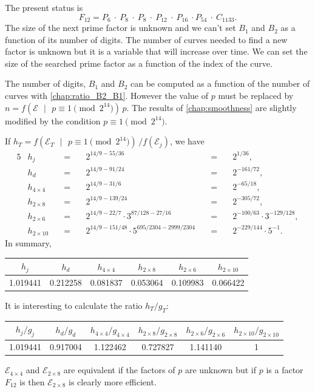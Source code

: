 \documentclass[a4paper, 11pt, pdftex]{report}
\theoremstyle{plain}
\theoremstyle{definition}
\newcommand\T{\rule{0pt}{2.6ex}}
\newcommand\B{\rule[-1.4ex]{0pt}{0pt}}
\begin{document}
The present status is
$$F_{12} = P_6 \:\cdot\: P_8 \:\cdot\: P_8 \:\cdot\: P_{12} \:\cdot\: P_{16} \:\cdot P_{54}
\:\cdot\: C_{1133}.$$
The size of the next prime factor is unknown and we can't set $B_1$ and $B_2$ as a function
of its number of digits. The number of curves needed to find a new factor is unknown but it
is a variable that will increase over time. We can set the size of the searched prime factor
as a function of the index of the curve.

The number of digits, $B_1$ and $B_2$ can be computed as a function of the number of curves
with \autoref{chap:ratio_B2_B1}. However the value of $p$ must be replaced by
$n = f(\mathcal{E} \text{ }|\text{ } p \equiv 1 \pmod{2^{14}})\,p$. The results of
\autoref{chap:smoothness} are slightly modified by the condition $p \equiv 1 \pmod{2^{14}}$.

If $h_T = f(\mathcal{E}_T \text{ }|\text{ } p \equiv 1 \pmod{2^{14}})\, / f(\mathcal{E}_j)$, we have
\begin{alignat*}{5}
&h_j           \quad &=& \quad 2^{14/9 - 55/36}  \quad &=& \quad 2^{1/36},\\
&h_d           \quad &=& \quad 2^{14/9 - 91/24}  \quad &=& \quad 2^{-161/72},\\
&h_{4\times4}  \quad &=& \quad 2^{14/9 - 31/6}   \quad &=& \quad 2^{-65/18},\\
&h_{2\times8}  \quad &=& \quad 2^{14/9 - 139/24} \quad &=& \quad 2^{-305/72},\\
&h_{2\times6}  \quad &=& \quad 2^{14/9 - 22/7}\cdot 3^{87/128 - 27/16} \quad &=& \quad 2^{-100/63}\cdot 3^{-129/128},\\
&h_{2\times10} \quad &=& \quad 2^{14/9 - 151/48}\cdot 5^{695/2304 - 2999/2304} \quad &=& \quad 2^{-229/144}\cdot 5^{-1}.
\end{alignat*}
In summary,
\begin{center}
\begin{tabular}{|c|c|c|c|c|c|}
\hline 
\B\T $h_j$ & $h_d$ & $h_{4\times4}$ & $h_{2\times8}$ & $h_{2\times6}$ & $h_{2\times10}$ \\ 
\hline 
\B\T 1.019441 & 0.212258 & 0.081837 & 0.053064 & 0.109983 & 0.066422 \\ 
\hline 
\end{tabular} 
\end{center}
It is interesting to calculate the ratio $h_T / g_T$:
\begin{center}
\begin{tabular}{|c|c|c|c|c|c|}
\hline 
\B\T $h_j / g_j$ & $h_d / g_d$ & $h_{4\times4} / g_{4\times4}$ & $h_{2\times8} / g_{2\times8}$ & $h_{2\times6} / g_{2\times6}$ & $h_{2\times10} / g_{2\times10}$ \\ 
\hline 
\B\T 1.019441 & 0.917004 & 1.122462 & 0.727827 & 1.141140 & 1 \\ 
\hline 
\end{tabular} 
\end{center}
$\mathcal{E}_{4\times4}$ and $\mathcal{E}_{2\times8}$ are equivalent if the factors of $p$
are unknown but if $p$ is a factor $F_{12}$ is then $\mathcal{E}_{2\times8}$ is clearly
more efficient.
\end{document}
